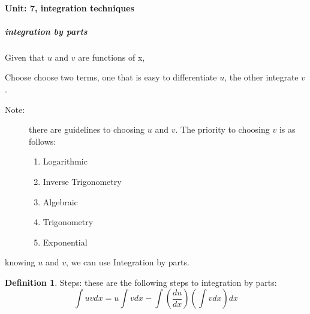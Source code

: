 \documentclass{article} %
\theoremstyle{theorem}
\theoremstyle{definition}
\newtheorem{definition}{Definition}[paragraph]
\begin{document}
            \paragraph{Unit: 7, integration techniques}
            \label{par:Unit-7}%
                \subparagraph{integration by parts}
                    Given that $u$ and $v$ are functions of x, 
                    \begin{itemize}
                        \item Choose choose two terms, one that is easy to differentiate $u$, the other integrate $v$.
                        \begin{description}
                            \item[Note:] there are guidelines to choosing $u$ and $v$. The priority to choosing $v$ is as follows:
                            \begin{enumerate}
                                \item Logarithmic
                                \item Inverse Trigonometry
                                \item Algebraic
                                \item Trigonometry
                                \item Exponential
                            \end{enumerate}
                        \end{description}
                        \item knowing $u$ and $v$, we can use Integration by parts. 
                        \begin{definition}
                            \item[Steps:] these are the following steps to integration by parts:
                                         \begin{equation}
                                            \label{eq:integratebyParts}
                                            \int uvdx = u\int vdx - \int (\dfrac{du}{dx})(\int vdx)dx
                                         \end{equation}
                        \end{definition}
                    \end{itemize}
            \pagebreak
\end{document}
